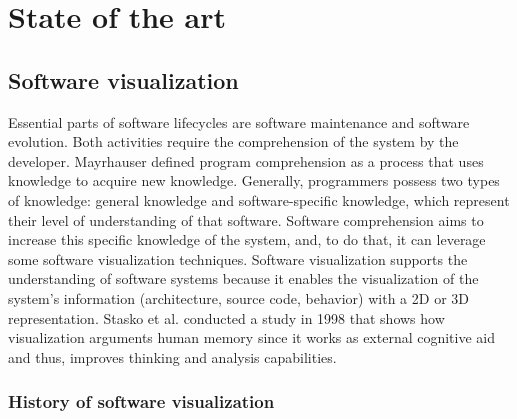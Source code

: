 
\chapter[Related Works]{State of the art}
\graphicspath{ {images/stateOfArt} }



\section{Software visualization}





Essential parts of software lifecycles are software maintenance and software evolution. 
Both activities require the comprehension of the system by the developer. 
Mayrhauser \cite{VonMayrhauser1995} defined program comprehension as a process that uses knowledge to acquire new knowledge. 
Generally, programmers possess two types of knowledge: general knowledge and software-specific knowledge, which represent their level of understanding of that software. 
Software comprehension aims to increase this specific knowledge of the system, and, to do that, it can leverage some software visualization techniques. 
Software visualization supports the understanding of software systems because it enables the visualization of the system's information (architecture, source code, behavior) with a 2D or 3D representation. 
Stasko et al.\cite{Stasko2008} conducted a study in 1998 that shows how visualization arguments human memory since it works as external cognitive aid and thus, improves thinking and analysis capabilities. \\

\subsection*{History of software visualization}



